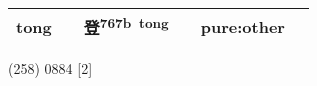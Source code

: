 \documentclass[14pt,a4paper]{scrartcl}
\begin{document}
\begin{longtable}[c]{@{}llllll@{}}
\begin{minipage}[t]{0.14\columnwidth}\raggedright\strut
tong
\strut\end{minipage} &
\begin{minipage}[t]{0.14\columnwidth}\raggedright\strut
\strut\end{minipage} &
\begin{minipage}[t]{0.14\columnwidth}\raggedright\strut
登\textsuperscript{767b~tong}
\strut\end{minipage} &
\begin{minipage}[t]{0.14\columnwidth}\raggedright\strut
\strut\end{minipage} &
\begin{minipage}[t]{0.14\columnwidth}\raggedright\strut
pure:other
\strut\end{minipage}\tabularnewline
\bottomrule
\end{longtable}

(258) 0884 {[}2{]}
\end{document}
